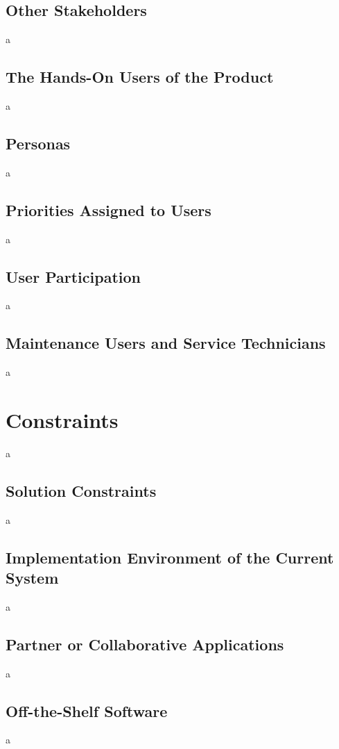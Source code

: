 \documentclass[12pt]{article}
\begin{document}
\subsection{Other Stakeholders}
a

\subsection{The Hands-On Users of the Product}
a

\subsection{Personas}
a

\subsection{Priorities Assigned to Users}
a

\subsection{User Participation}
a

\subsection{Maintenance Users and Service Technicians}
a

\section{Constraints}
a

\subsection{Solution Constraints}
a

\subsection{Implementation Environment of the Current System}
a

\subsection{Partner or Collaborative Applications}
a

\subsection{Off-the-Shelf Software}
a
\end{document}
